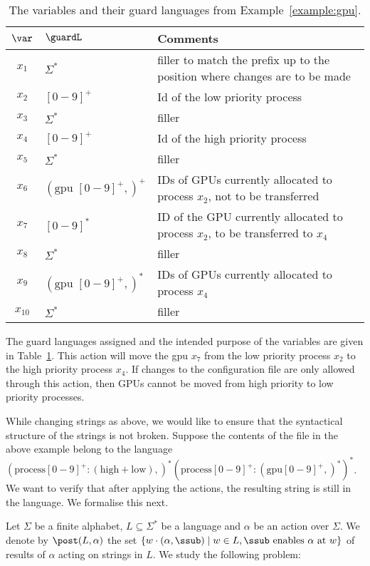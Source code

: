 \begin{example}
\begin{table}[t]
	\centering
\begin{tabular}{|c | l  | p{9cm}|}
	\hline
	$\var$ & $\guardL$ & Comments\\
	\hline
	\hline
	$x_1$ & $\Sigma^*$ & filler to match the prefix up to the 
	position where 	changes are to be made\\
	\hline
	$x_2$ & $[0-9]^+$ & Id of the low priority process\\
	\hline
	$x_3$ & $\Sigma^*$ & filler\\
	\hline
	$x_4$ & $[0-9]^+$ & Id of the high priority process\\
	\hline
	$x_5$ & $\Sigma^*$ & filler\\
	\hline
	$x_6$ & $(\text{gpu }[0-9]^+,)^+$ &IDs of GPUs currently allocated 
		to 	process $x_2$,  not to be transferred\\
		\hline
			$x_7$ & $[0-9]^*$ &ID of the GPU currently allocated 
		to 	process $x_2$,   to be transferred to $x_4$\\
		\hline
			$x_8$ & $\Sigma^*$ & filler\\
			\hline
				$x_9$ & $(\text{gpu }[0-9]^+,)^*$ &IDs of GPUs currently allocated 
			to 	process $x_4$\\
			\hline
			$x_{10}$ & $\Sigma^*$ & filler\\
\hline			
\end{tabular}
\caption{The variables and their guard languages from Example~\ref{example:gpu}.}\label{table:gpu}
\end{table}
The guard languages assigned and the intended purpose of the variables 
are given in Table~\ref{table:gpu}.
This action will move the gpu $x_7$ from the low priority process $x_2$ to 
the high priority process $x_4$. If changes to the configuration file 
are only allowed through this action, then GPUs cannot be moved 
from high priority to low priority processes.	
\end{example}
\smallskip

While changing strings as above, we would like to ensure that the 
syntactical structure of the strings is not broken. Suppose the 
contents of the file in the above example belong to the language 
$(\mathrm{process [0-9]^+}:(\mathrm{high}+\mathrm{low}), )^* 
(\mathrm{process}[0-9]^+:(\mathrm{gpu}[0-9]^+,)^*)^*$. We want to verify that after applying the actions, the resulting string is still in the 
language. We formalise this next.

Let $\Sigma$ be a finite alphabet, $L \subseteq \Sigma^*$ be a language and $\alpha$ be an action over $\Sigma$. We denote by
$\post(L, \alpha)$ the set $\{w \cdot (\alpha, \ssub) \mid  w \in L, \ssub \text{ enables } \alpha \text{ at } w\}$ of results of $\alpha$ acting on strings in $L$. We study the following problem:
\medskip

